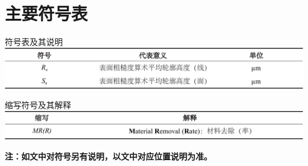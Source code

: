 \chapter*{主要符号表}

\begin{center}
	符号表及其说明
	\includegraphics[width=1.0\textwidth]{figures/ch0/ch0_tab_Notation1}
\end{center}

\clearpage

\begin{center}
	缩写符号及其解释
	\includegraphics[width=1.0\textwidth]{figures/ch0/ch0_tab_Notation2}
\end{center}
{\textbf{注：如文中对符号另有说明，以文中对应位置说明为准。}}
